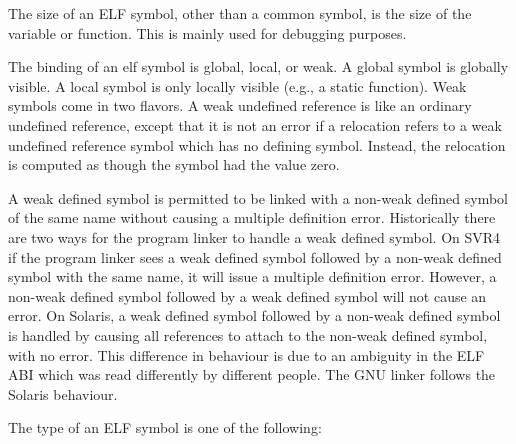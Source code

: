 The size of an ELF symbol, other than a common symbol, is the size of the
variable or function.  This is mainly used for debugging purposes.

The binding of an elf symbol is global, local, or weak.  A global symbol is
globally visible.  A local symbol is only locally visible (e.g., a static
function).  Weak symbols come in two flavors.  A weak undefined reference is
like an ordinary undefined reference, except that it is not an error if a
relocation refers to a weak undefined reference symbol which has no defining
symbol.  Instead, the relocation is computed as though the symbol had the value
zero.

A weak defined symbol is permitted to be linked with a non-weak defined symbol
of the same name without causing a multiple definition error.  Historically
there are two ways for the program linker to handle a weak defined symbol.  On
SVR4 if the program linker sees a weak defined symbol followed by a non-weak
defined symbol with the same name, it will issue a multiple definition error.
However, a non-weak defined symbol followed by a weak defined symbol will not
cause an error.  On Solaris, a weak defined symbol followed by a non-weak
defined symbol is handled by causing all references to attach to the non-weak
defined symbol, with no error.  This difference in behaviour is due to an
ambiguity in the ELF ABI which was read differently by different people.  The
GNU linker follows the Solaris behaviour.

The type of an ELF symbol is one of the following:

